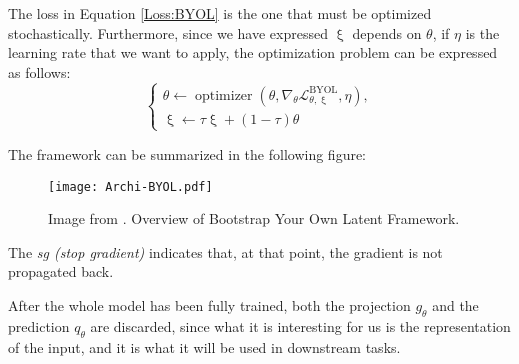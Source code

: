 The loss in Equation \eqref{Loss:BYOL} is the one that must be optimized stochastically. Furthermore, since we have expressed $\upxi$ depends on $\theta$, if $\eta$ is the learning rate that we want to apply, the optimization problem can be expressed as follows:
\[
\begin{cases}
    \theta \gets \operatorname{optimizer}\left(\theta,\nabla_\theta \mathcal L_{\theta,\upxi}^{\operatorname{BYOL}},\eta \right), \\
    \upxi \gets \tau \upxi + (1-\tau)\theta 
\end{cases}
\]

The framework can be summarized in the following figure:
\begin{figure}[H]
    \centering 
    \texttt{[image: Archi-BYOL.pdf]}
    \caption{Image from \citep{grill2020bootstrap}. Overview of Bootstrap Your Own Latent Framework. }
\end{figure}

The \emph{sg (stop gradient)} indicates that, at that point, the gradient is not propagated back. 

After the whole model has been fully trained, both the projection $g_\theta$  and the prediction $q_\theta$ are discarded, since what it is interesting for us is the representation of the input, and it is what it will be used in downstream tasks.